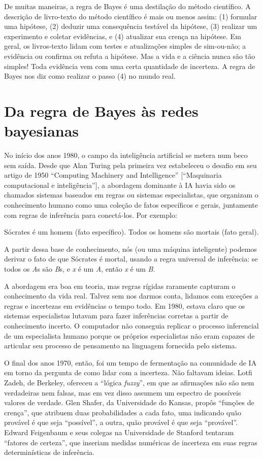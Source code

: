 \documentclass[11pt,a5paper,twoside]{book}
\begin{document}
De muitas maneiras, a regra de Bayes é uma destilação do método científico. A descrição de livro-texto do método científico é mais ou menos assim: (1) formular uma hipótese, (2) deduzir uma consequência testável da hipótese, (3) realizar um experimento e coletar evidências, e (4) atualizar sua crença na hipótese. Em geral, os livros-texto lidam com testes e atualizações simples de sim-ou-não; a evidência ou confirma ou refuta a hipótese. Mas a vida e a ciência nunca são tão simples! Toda evidência vem com uma certa quantidade de incerteza. A regra de Bayes nos diz como realizar o passo (4) no mundo real.

\section{Da regra de Bayes às redes bayesianas}
No início dos anos 1980, o campo da inteligência artificial se metera num beco sem saída. Desde que Alan Turing pela primeira vez estabeleceu o desafio em seu artigo de 1950 “Computing Machinery and Intelligence” [“Maquinaria computacional e inteligência”], a abordagem dominante à IA havia sido os chamados sistemas baseados em regras ou sistemas especialistas, que organizam o conhecimento humano como uma coleção de fatos específicos e gerais, juntamente com regras de inferência para conectá-los. Por exemplo:

Sócrates é um homem (fato específico). Todos os homens são mortais (fato geral).

A partir dessa base de conhecimento, nós (ou uma máquina inteligente) podemos derivar o fato de que Sócrates é mortal, usando a regra universal de inferência: se todos os \textit{A}s são \textit{B}s, e \textit{x} é um \textit{A}, então \textit{x} é um \textit{B}.

A abordagem era boa em teoria, mas regras rígidas raramente capturam o conhecimento da vida real. Talvez sem nos darmos conta, lidamos com exceções a regras e incertezas em evidências o tempo todo. Em 1980, estava claro que os sistemas especialistas lutavam para fazer inferências corretas a partir de conhecimento incerto. O computador não conseguia replicar o processo inferencial de um especialista humano porque os próprios especialistas não eram capazes de articular seu processo de pensamento na linguagem fornecida pelo sistema.

O final dos anos 1970, então, foi um tempo de fermentação na comunidade de IA em torno da pergunta de como lidar com a incerteza. Não faltavam ideias. Lotfi Zadeh, de Berkeley, ofereceu a “lógica \textit{fuzzy}”, em que as afirmações não são nem verdadeiras nem falsas, mas em vez disso assumem um espectro de possíveis valores de verdade. Glen Shafer, da Universidade do Kansas, propôs “funções de crença”, que atribuem duas probabilidades a cada fato, uma indicando quão provável é que seja “possível”, a outra, quão provável é que seja “provável”. Edward Feigenbaum e seus colegas na Universidade de Stanford tentaram “fatores de certeza”, que inseriam medidas numéricas de incerteza em suas regras determinísticas de inferência.
\end{document}

